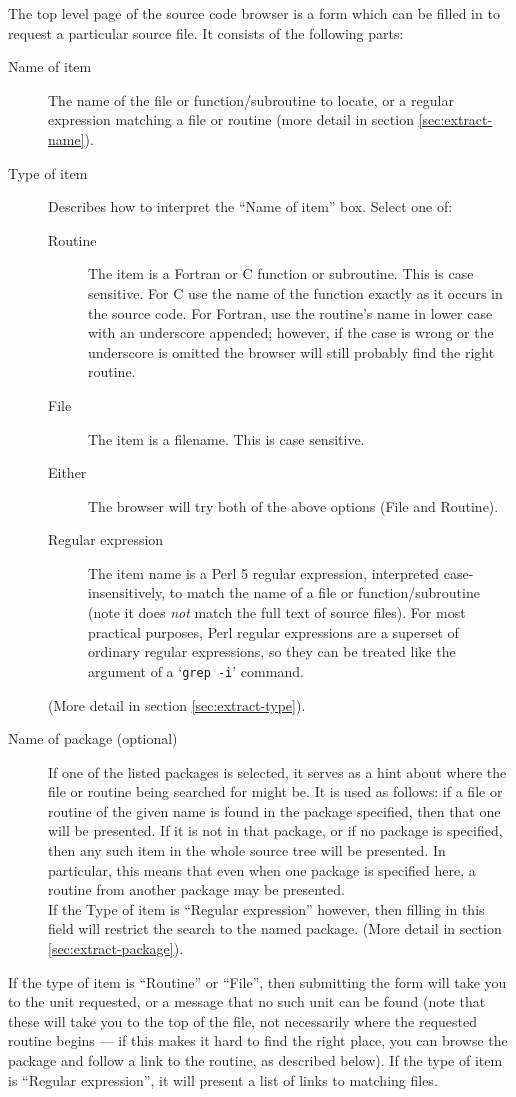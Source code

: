 \documentclass[twoside,11pt]{article}
\renewcommand{\_}{\texttt{\symbol{95}}}
\begin{document}
The top level page of the source code browser is a form
which can be filled in to request a particular source file.
It consists of the following parts:
\begin{description}
\item[Name of item]
The name of the file or function/subroutine to locate,
or a regular expression matching a file or routine
(more detail in section \ref{sec:extract-name}).
\item[Type of item]
Describes how to interpret the ``Name of item'' box.  Select one of:
\begin{description}
   \item[Routine]
   The item is a Fortran or C function or subroutine.
   This is case sensitive.
   For C use the name of the function exactly as it occurs in the source code.
   For Fortran, use the routine's name in lower case with an
   underscore appended;
   however, if the case is wrong or the underscore is omitted the
   browser will still probably
   find the right routine.
   \item[File]
   The item is a filename.  This is case sensitive.
   \item[Either]
   The browser will try both of the above options (File and Routine).
   \item[Regular expression]
   The item name is a Perl 5 regular expression,
   interpreted case-insensitively,
   to match the name of a file or function/subroutine
   (note it does {\em not\/} match the full text of source files).
   For most practical purposes, Perl regular expressions are a superset
   of ordinary regular expressions, so they can be treated like the
   argument of a `{\tt grep -i}' command.
\end{description}
(More detail in section \ref{sec:extract-type}).
\item[Name of package (optional)]
If one of the listed packages is selected, it serves
as a hint about where the file or routine being searched for might be.
It is used as follows: if a file or routine of the given name is found
in the package specified, then that one will be presented.
If it is not in that package, or if no package is specified,
then any such item in the whole source tree will be presented.
In particular, this means that even when one package is specified here,
a routine from another package may be presented.\\
If the Type of item is ``Regular expression'' however, then filling in this
field will restrict the search to the named package.
(More detail in section \ref{sec:extract-package}).
\end{description}
If the type of item is ``Routine'' or ``File'', then submitting
the form will take you to the unit requested, or a message
that no such unit can be found
(note that these will take you to the top of the file,
not necessarily where the requested routine begins ---
if this makes it hard to find the right place, you can browse the
package and follow a link to the routine, as described below).
If the type of item is ``Regular expression'',
it will present a list of links to
matching files.
\end{document}
